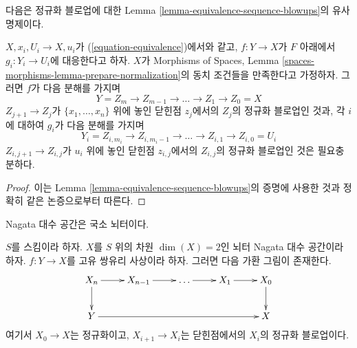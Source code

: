 \noindent
다음은 정규화 블로업에 대한
Lemma \ref{lemma-equivalence-sequence-blowups}의 유사 명제이다.

\begin{lemma}
\label{lemma-equivalence-sequence-normalized-blowups}
$X, x_i, U_i \to X, u_i$가 (\ref{equation-equivalence})에서와 같고,
$f : Y \to X$가 $F$ 아래에서 $g_i : Y_i \to U_i$에 대응한다고 하자.
$X$가 Morphisms of Spaces, Lemma
\ref{spaces-morphisms-lemma-prepare-normalization}의 동치 조건들을
만족한다고 가정하자. 그러면 $f$가 다음 분해를 가지며
$$
Y = Z_m \to Z_{m - 1} \to \ldots \to Z_1 \to Z_0 = X
$$
$Z_{j + 1} \to Z_j$가 $\{x_1, \ldots, x_n\}$ 위에 놓인 닫힌점
$z_j$에서의 $Z_j$의 정규화 블로업인 것과, 각 $i$에 대하여
$g_i$가 다음 분해를 가지며
$$
Y_i = Z_{i, m_i} \to Z_{i, m_i - 1} \to \ldots \to Z_{i, 1} \to Z_{i, 0} = U_i
$$
$Z_{i, j + 1} \to Z_{i, j}$가 $u_i$ 위에 놓인 닫힌점
$z_{i, j}$에서의 $Z_{i, j}$의 정규화 블로업인 것은 필요충분하다.
\end{lemma}

\begin{proof}
이는 Lemma \ref{lemma-equivalence-sequence-blowups}의 증명에 사용한 것과
정확히 같은 논증으로부터 따른다.
\end{proof}

\noindent
Nagata 대수 공간은 국소 뇌터이다.

\begin{lemma}
\label{lemma-dominate-by-normalized-blowing-up}
$S$를 스킴이라 하자. $X$를 $S$ 위의 차원
$\dim(X) = 2$인 뇌터 Nagata 대수 공간이라 하자.
$f : Y \to X$를 고유 쌍유리 사상이라 하자.
그러면 다음 가환 그림이 존재한다.
$$
\xymatrix{
X_n \ar[r] \ar[d] &
X_{n - 1} \ar[r] &
\ldots \ar[r] &
X_1 \ar[r] &
X_0 \ar[d] \\
Y \ar[rrrr]  & & & & X
}
$$
여기서 $X_0 \to X$는 정규화이고,
$X_{i + 1} \to X_i$는 닫힌점에서의 $X_i$의 정규화 블로업이다.
\end{lemma}

